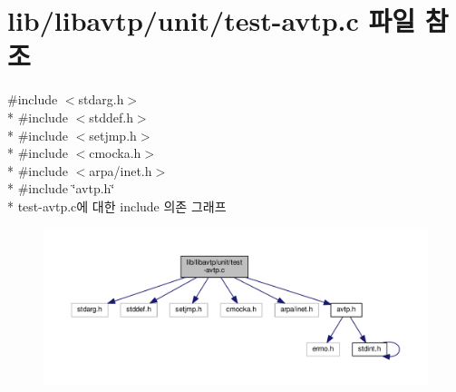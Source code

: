 \hypertarget{test-avtp_8c}{}\section{lib/libavtp/unit/test-\/avtp.c 파일 참조}
\label{test-avtp_8c}
{\ttfamily \#include $<$stdarg.\+h$>$}\\*
{\ttfamily \#include $<$stddef.\+h$>$}\\*
{\ttfamily \#include $<$setjmp.\+h$>$}\\*
{\ttfamily \#include $<$cmocka.\+h$>$}\\*
{\ttfamily \#include $<$arpa/inet.\+h$>$}\\*
{\ttfamily \#include \char`\"{}avtp.\+h\char`\"{}}\\*
test-\/avtp.c에 대한 include 의존 그래프
\nopagebreak
\begin{figure}[H]
\begin{center}
\leavevmode
\includegraphics[width=350pt]{test-avtp_8c__incl}
\end{center}
\end{figure}
